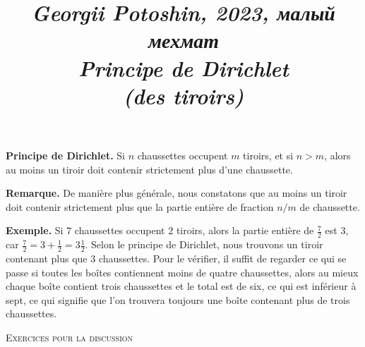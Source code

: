 \documentclass{article}
\title{
\textit{\small{Georgii Potoshin, 2023, малый мехмат}}\\
\vspace{0.3ex}
\textit{\huge{Principe de Dirichlet \\ (des tiroirs)}}\vspace{1ex}
}
\date{\vspace{-8ex}}
\begin{document}
\maketitle
\textbf{Principe de Dirichlet.} Si $n$ chaussettes occupent $m$ tiroirs, et si $n > m$, alors au moins un tiroir doit contenir strictement plus d'une chaussette.
\par
\vspace{3ex}
\textbf{Remarque.} De manière plus générale, nous constatons que au moins un tiroir doit contenir strictement plus que la partie entière de fraction $n/m$ de chaussette.
\par
\vspace{3ex}
\textbf{Exemple.} Si $7$ chaussettes occupent $2$ tiroirs, alors la partie entière de $\frac{7}{2}$ est $3$, car $\frac{7}{2} = 3 + \frac{1}{2} = 3\frac{1}{2}$. Selon le principe de Dirichlet, nous trouvons un tiroir contenant plus que 3 chaussettes. Pour le vérifier, il suffit de regarder ce qui se passe si toutes les boîtes contiennent moins de quatre chaussettes, alors au mieux chaque boîte contient trois chaussettes et le total est de six, ce qui est inférieur à sept, ce qui signifie que l'on trouvera toujours une boîte contenant plus de trois chaussettes.
\par
\vspace{2ex}
\begin{center}\textsc{\Large{Exercices pour la discussion}}\end{center}
\end{document}
